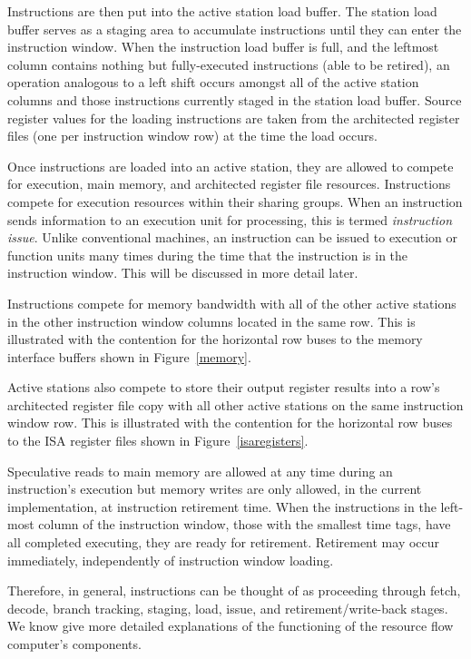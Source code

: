 \documentclass[10pt,dvips]{article}
\begin{document}
Instructions are then put into the active station load buffer.
The station load buffer serves as a staging area to accumulate
instructions until they can enter the instruction window.  When the
instruction load buffer is full, and the leftmost column contains nothing
but fully-executed instructions (able to be retired), an operation
analogous to a left shift occurs amongst all of the active station
columns and those instructions currently staged in the station load
buffer.  Source register values for the
loading instructions are taken from the
architected register files (one per instruction window row) at the time
the load occurs.

Once instructions are loaded into an active station, they are allowed
to compete for execution, main memory, and architected register
file resources.  Instructions compete for execution resources
within their sharing groups.  When an instruction sends information to
an execution unit for processing, this is termed {\it instruction
issue}.  Unlike conventional machines, an instruction can be issued to
execution or function units many times during the time that
the instruction is in
the instruction window.  This will be discussed in more detail later.

Instructions compete for memory bandwidth with all of the other active
stations in the other instruction window columns located in the same
row.  This is illustrated with the contention for the horizontal row
buses to the memory interface buffers shown in Figure~\ref{memory}.

Active
stations also compete to store their output register results into
a row's
architected register file copy with all other active stations on the same
instruction window row.  This is illustrated with the contention for
the horizontal row buses to the ISA register files shown in
Figure~\ref{isaregisters}.

Speculative reads to main memory are allowed at any time during an
instruction's execution but memory writes are only allowed, in the
current implementation, at instruction retirement time.
When the instructions in the
left-most column of the instruction window, those with the smallest
time tags, have all completed executing, they are ready for
retirement.  Retirement may occur immediately, independently of
instruction window loading.

Therefore, in
general, instructions can be thought of as proceeding through fetch,
decode, branch tracking, staging, load, issue, and
retirement/write-back stages. We know give more detailed explanations
of the functioning of the resource flow computer's components.
\end{document}
